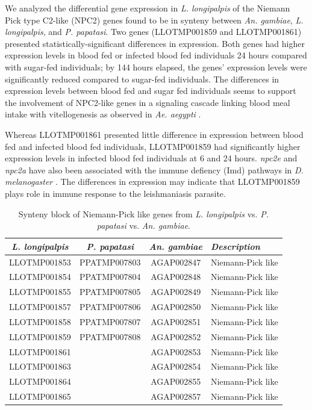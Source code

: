 We analyzed the differential gene expression in \emph{L. longipalpis} of the Niemann Pick type C2-like (NPC2) genes found to be in synteny between \emph{An. gambiae}, \emph{L. longipalpis}, and \emph{P. papatasi}.  Two genes (LLOTMP001859 and LLOTMP001861) presented statistically-significant differences in expression. Both genes had higher expression levels in blood fed or infected blood fed individuals 24 hours compared with sugar-fed individuals; by 144 hours elapsed, the genes' expression levels were significantly reduced compared to sugar-fed individuals.  The differences in expression levels between blood fed and sugar fed individuals seems to support the involvement of NPC2-like genes in a signaling cascade linking blood meal intake with vitellogenesis as observed in \emph{Ae. aegypti} \cite{Sirot2011}.

Whereas LLOTMP001861 presented little difference in expression between blood fed and infected blood fed individuals, LLOTMP001859 had significantly higher expression levels in infected blood fed individuals at 6 and 24 hours.  \emph{npc2e} and \emph{npc2a} have also been associated with the immune defiency (Imd) pathways in \emph{D. melanogaster} \cite{Shi2012}.  The differences in expression may indicate that LLOTMP001859 plays role in immune response to the leishmaniasis parasite.

\begin{table}[H]
  \centering
  \begin{tabular}{c c c l} \hline
    \emph{L. longipalpis} & \emph{P. papatasi} & \emph{An. gambiae} & \emph{Description} \\ \hline
    LLOTMP001853 & PPATMP007803 & AGAP002847 & Niemann-Pick like \\
    LLOTMP001854 & PPATMP007804 & AGAP002848 & Niemann-Pick like \\
    LLOTMP001855 & PPATMP007805 & AGAP002849 & Niemann-Pick like \\
    LLOTMP001857 & PPATMP007806 & AGAP002850 & Niemann-Pick like \\
    LLOTMP001858 & PPATMP007807 & AGAP002851 & Niemann-Pick like \\
    LLOTMP001859 & PPATMP007808 & AGAP002852 & Niemann-Pick like \\
    LLOTMP001861 & & AGAP002853 & Niemann-Pick like \\
    LLOTMP001863 & & AGAP002854 & Niemann-Pick like \\
    LLOTMP001864 & & AGAP002855 & Niemann-Pick like \\
    LLOTMP001865 & & AGAP002857 & Niemann-Pick like
    \end{tabular}
    \caption{Synteny block of Niemann-Pick like genes from \emph{L. longipalpis} vs. \emph{P. papatasi} vs. \emph{An. gambiae}.}
  \label{tab:synteny-three-way-npc2}
\end{table}

